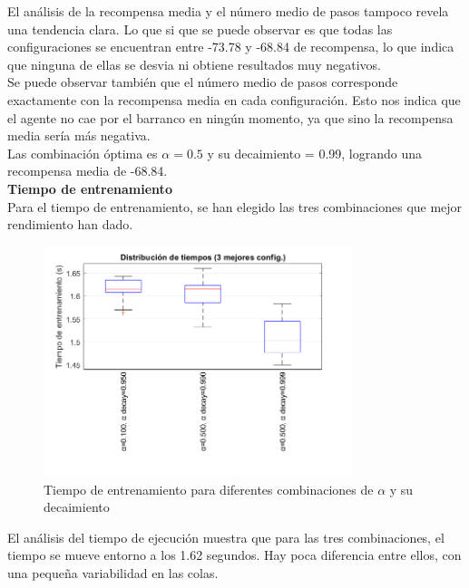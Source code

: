 El análisis de la recompensa media y el número medio de pasos tampoco revela una tendencia clara. Lo que si que se puede observar es que todas las configuraciones se encuentran entre -73.78 y -68.84 de recompensa, lo que indica que ninguna de ellas se desvia ni obtiene resultados muy negativos. 
\\

Se puede observar también que el número medio de pasos corresponde exactamente con la recompensa media en cada configuración. Esto nos indica que el agente no cae por el barranco en ningún momento, ya que sino la recompensa media sería más negativa.
\\

Las combinación óptima es $\alpha = 0.5$ y su decaimiento = 0.99, logrando una recompensa media de -68.84.
\\

\textbf{Tiempo de entrenamiento}
\\

Para el tiempo de entrenamiento, se han elegido las tres combinaciones que mejor rendimiento han dado. 

\begin{figure}[H]
    \centering
    \includegraphics[width=0.8\textwidth]{../../experiments/qlearning/experiment-3/results/time.png}
    \caption{Tiempo de entrenamiento para diferentes combinaciones de $\alpha$ y su decaimiento}
    \label{fig:qlearning-time}
\end{figure}

El análisis del tiempo de ejecución muestra que para las tres combinaciones, el tiempo se mueve entorno a los 1.62 segundos. Hay poca diferencia entre ellos, con una pequeña variabilidad en las colas. 
\\

